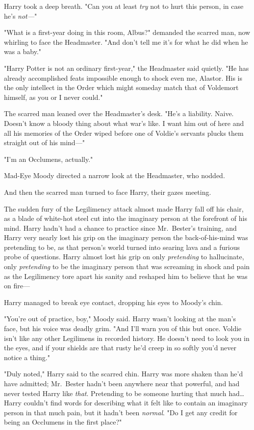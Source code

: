 Harry took a deep breath. "Can you at least \emph{try} not to hurt this person, in case he's \emph{not---}"

"What is a first-year doing in this room, Albus?" demanded the scarred man, now whirling to face the Headmaster. "And don't tell me it's for what he did when he was a baby."

"Harry Potter is not an ordinary first-year," the Headmaster said quietly. "He has already accomplished feats impossible enough to shock even me, Alastor. His is the only intellect in the Order which might someday match that of Voldemort himself, as you or I never could."

The scarred man leaned over the Headmaster's desk. "He's a liability. Naive. Doesn't know a bloody thing about what war's like. I want him out of here and all his memories of the Order wiped before one of Voldie's servants plucks them straight out of his mind---"

"I'm an Occlumens, actually."

Mad-Eye Moody directed a narrow look at the Headmaster, who nodded.

And then the scarred man turned to face Harry, their gazes meeting.

The sudden fury of the Legilimency attack almost made Harry fall off his chair, as a blade of white-hot steel cut into the imaginary person at the forefront of his mind. Harry hadn't had a chance to practice since Mr.~Bester's training, and Harry very nearly lost his grip on the imaginary person the back-of-his-mind was pretending to be, as that person's world turned into searing lava and a furious probe of questions. Harry almost lost his grip on only \emph{pretending} to hallucinate, only \emph{pretending} to be the imaginary person that was screaming in shock and pain as the Legilimency tore apart his sanity and reshaped him to believe that he was on fire---

Harry managed to break eye contact, dropping his eyes to Moody's chin.

"You're out of practice, boy," Moody said. Harry wasn't looking at the man's face, but his voice was deadly grim. "And I'll warn you of this but once. Voldie isn't like any other Legilimens in recorded history. He doesn't need to look you in the eyes, and if your shields are that rusty he'd creep in so softly you'd never notice a thing."

"Duly noted," Harry said to the scarred chin. Harry was more shaken than he'd have admitted; Mr.~Bester hadn't been anywhere near that powerful, and had never tested Harry like \emph{that}. Pretending to be someone hurting that much had{\ldots} Harry couldn't find words for describing what it felt like to contain an imaginary person in that much pain, but it hadn't been \emph{normal}. "Do I get any credit for being an Occlumens in the first place?"

